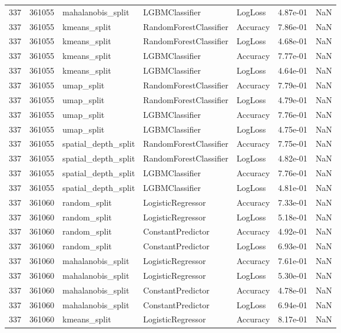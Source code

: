 \begin{tabular}{rrlllrr}
337 & 361055 & mahalanobis\_split & LGBMClassifier & LogLoss & 4.87e-01 & NaN \\
337 & 361055 & kmeans\_split & RandomForestClassifier & Accuracy & 7.86e-01 & NaN \\
337 & 361055 & kmeans\_split & RandomForestClassifier & LogLoss & 4.68e-01 & NaN \\
337 & 361055 & kmeans\_split & LGBMClassifier & Accuracy & 7.77e-01 & NaN \\
337 & 361055 & kmeans\_split & LGBMClassifier & LogLoss & 4.64e-01 & NaN \\
337 & 361055 & umap\_split & RandomForestClassifier & Accuracy & 7.79e-01 & NaN \\
337 & 361055 & umap\_split & RandomForestClassifier & LogLoss & 4.79e-01 & NaN \\
337 & 361055 & umap\_split & LGBMClassifier & Accuracy & 7.76e-01 & NaN \\
337 & 361055 & umap\_split & LGBMClassifier & LogLoss & 4.75e-01 & NaN \\
337 & 361055 & spatial\_depth\_split & RandomForestClassifier & Accuracy & 7.75e-01 & NaN \\
337 & 361055 & spatial\_depth\_split & RandomForestClassifier & LogLoss & 4.82e-01 & NaN \\
337 & 361055 & spatial\_depth\_split & LGBMClassifier & Accuracy & 7.76e-01 & NaN \\
337 & 361055 & spatial\_depth\_split & LGBMClassifier & LogLoss & 4.81e-01 & NaN \\
337 & 361060 & random\_split & LogisticRegressor & Accuracy & 7.33e-01 & NaN \\
337 & 361060 & random\_split & LogisticRegressor & LogLoss & 5.18e-01 & NaN \\
337 & 361060 & random\_split & ConstantPredictor & Accuracy & 4.92e-01 & NaN \\
337 & 361060 & random\_split & ConstantPredictor & LogLoss & 6.93e-01 & NaN \\
337 & 361060 & mahalanobis\_split & LogisticRegressor & Accuracy & 7.61e-01 & NaN \\
337 & 361060 & mahalanobis\_split & LogisticRegressor & LogLoss & 5.30e-01 & NaN \\
337 & 361060 & mahalanobis\_split & ConstantPredictor & Accuracy & 4.78e-01 & NaN \\
337 & 361060 & mahalanobis\_split & ConstantPredictor & LogLoss & 6.94e-01 & NaN \\
337 & 361060 & kmeans\_split & LogisticRegressor & Accuracy & 8.17e-01 & NaN \\

\end{tabular}

